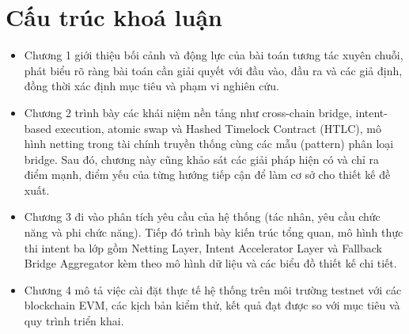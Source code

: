 \section{Cấu trúc khoá luận}

\begin{itemize}
    \item Chương 1 giới thiệu bối cảnh và động lực của bài toán tương tác xuyên chuỗi, phát biểu rõ ràng bài toán cần giải quyết với đầu vào, đầu ra và các giả định, đồng thời xác định mục tiêu và phạm vi nghiên cứu.
    \item Chương 2 trình bày các khái niệm nền tảng như cross-chain bridge, intent-based execution, atomic swap và Hashed Timelock Contract (HTLC), mô hình netting trong tài chính truyền thống cùng các mẫu (pattern) phân loại bridge. Sau đó, chương này cũng khảo sát các giải pháp hiện có và chỉ ra điểm mạnh, điểm yếu của từng hướng tiếp cận để làm cơ sở cho thiết kế đề xuất.
    \item Chương 3 đi vào phân tích yêu cầu của hệ thống (tác nhân, yêu cầu chức năng và phi chức năng). Tiếp đó trình bày kiến trúc tổng quan, mô hình thực thi intent ba lớp gồm Netting Layer, Intent Accelerator Layer và Fallback Bridge Aggregator kèm theo mô hình dữ liệu và các biểu đồ thiết kế chi tiết.
    \item Chương 4 mô tả việc cài đặt thực tế hệ thống trên môi trường testnet với các blockchain EVM, các kịch bản kiểm thử, kết quả đạt được so với mục tiêu và quy trình triển khai.
\end{itemize}
